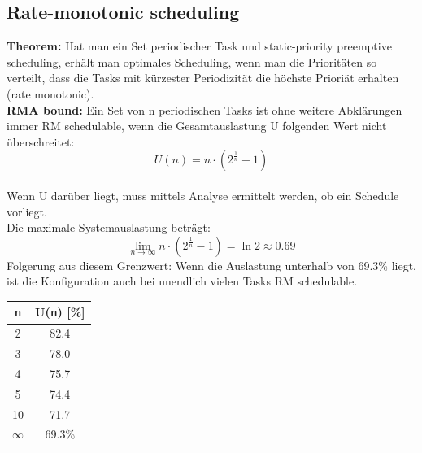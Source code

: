 \subsection{Rate-monotonic scheduling}
\begin{minipage}{0.8\linewidth}
\textbf{Theorem:}
Hat man ein Set periodischer Task und static-priority preemptive scheduling, erhält man optimales Scheduling, wenn man die Prioritäten so verteilt, dass die Tasks mit kürzester Periodizität die höchste Prioriät erhalten (rate monotonic).\\
\textbf{RMA bound:}
Ein Set von n periodischen Tasks ist ohne weitere Abklärungen immer RM schedulable, wenn die Gesamtauslastung U folgenden Wert nicht überschreitet:
\begin{equation}
U(n) = n\cdot (2^{\frac{1}{n}}-1)
\end{equation}\\
Wenn U darüber liegt, muss mittels Analyse ermittelt werden, ob ein Schedule vorliegt.\\

Die maximale Systemauslastung beträgt:
\begin{equation}
\lim_{n \to \infty}n\cdot(2^\frac{1}{n}-1) = \ln 2 \approx 0.69
\end{equation}
Folgerung aus diesem Grenzwert: Wenn die Auslastung unterhalb von 69.3\% liegt, ist die Konfiguration auch bei unendlich vielen Tasks RM schedulable.
\end{minipage}
\begin{minipage}{0.2\linewidth}
\centering
\begin{tabular}{| c | c |}
\hline
n & U(n) [\%]\\
\hline
2 & 82.4\\
3 & 78.0\\
4 & 75.7\\
5 & 74.4\\
10 & 71.7\\
$\infty$ & 69.3\%\\
\hline
\end{tabular}
\end{minipage}

